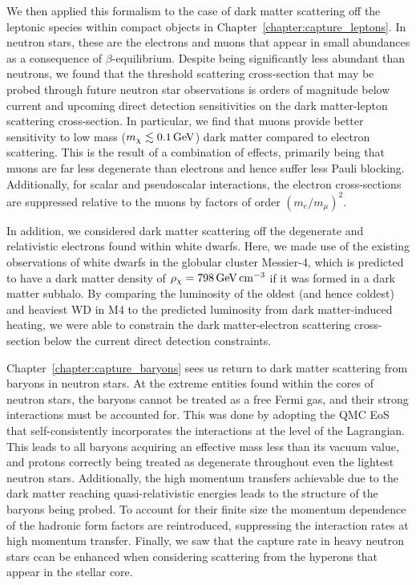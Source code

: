 We then applied this formalism to the case of dark matter scattering off the leptonic species within compact objects in Chapter~\ref{chapter:capture_leptons}. In neutron stars, these are the electrons and muons that appear in small abundances as a consequence of $\beta$-equilibrium. Despite being significantly less abundant than neutrons, we found that the threshold scattering cross-section that may be probed through future neutron star observations is orders of magnitude below current and upcoming direct detection sensitivities on the dark matter-lepton scattering cross-section. In particular, we find that muons provide better sensitivity to low mass ($m_\chi\lesssim 0.1{\rm \,GeV}$) dark matter compared to electron scattering. This is the result of a combination of effects, primarily being that muons are far less degenerate than electrons and hence suffer less Pauli blocking. Additionally, for scalar and pseudoscalar interactions, the electron cross-sections are suppressed relative to the muons by factors of order  $(m_e/m_\mu)^2$. 

In addition, we considered dark matter scattering off the degenerate and relativistic electrons found within white dwarfs.  Here, we made use of the existing observations of white dwarfs in the globular cluster Messier-4, which is predicted to have a dark matter density of $\rho_\chi = 798{\rm \,GeV} {\rm \,cm}^{-3}$ if it was formed in a dark matter subhalo. By comparing the luminosity of the oldest (and hence coldest) and heaviest WD in M4 to the predicted luminosity from dark matter-induced heating, we were able to constrain the dark matter-electron scattering cross-section below the current direct detection constraints. 

Chapter~\ref{chapter:capture_baryons} sees us return to dark matter scattering from baryons in neutron stars. At the extreme entities found within the cores of neutron stars, the baryons cannot be treated as a free Fermi gas, and their strong interactions must be accounted for. This was done by adopting the QMC EoS that self-consistently incorporates the interactions at the level of the Lagrangian. This leads to all baryons acquiring an effective mass less than its vacuum value, and protons correctly being treated as degenerate throughout even the lightest neutron stars. Additionally, the high momentum transfers achievable due to the dark matter reaching quasi-relativistic energies leads to the structure of the baryons being probed. To account for their finite size the momentum dependence of the hadronic form factors are reintroduced, suppressing the interaction rates at high momentum transfer. Finally, we saw that the capture rate in heavy neutron stars ccan be enhanced when considering scattering from the hyperons that appear in the stellar core. 

